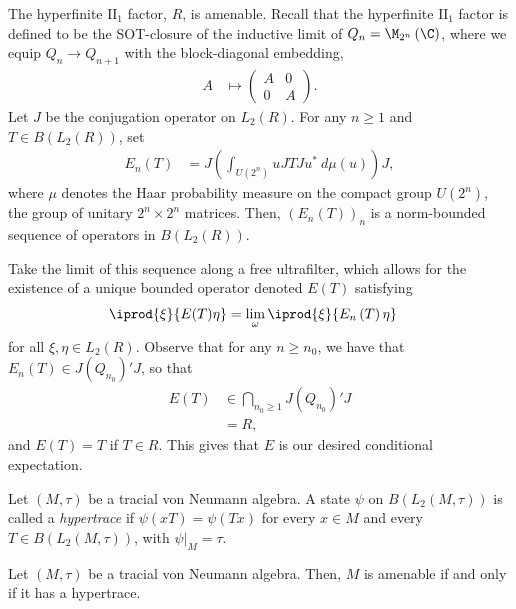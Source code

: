 \documentclass[10pt]{mypackage}
\begin{document}
\begin{example}
  The hyperfinite $\text{II}_1$ factor, $R$, is amenable. Recall that the hyperfinite $\text{II}_1$ factor is defined to be the SOT-closure of the inductive limit of $Q_n = \M_{2^n}\left( \C \right)$, where we equip $Q_n\rightarrow Q_{n+1}$ with the block-diagonal embedding,
  \begin{align*}
    A &\mapsto \begin{pmatrix}A  & 0 \\ 0 & A\end{pmatrix}.
  \end{align*}
  Let $J$ be the conjugation operator on $L_2\left( R \right)$. For any $n\geq 1$ and $T\in B\left( L_2\left( R \right) \right)$, set
  \begin{align*}
    E_n(T) &= J \left( \int_{U\left( 2^{n} \right)}^{} uJTJu^{\ast}\:d\mu(u) \right)J,
  \end{align*}
  where $\mu$ denotes the Haar probability measure on the compact group $U\left( 2^{n} \right)$, the group of unitary $2^{n}\times 2^{n}$ matrices. Then, $\left( E_n\left( T \right) \right)_n$ is a norm-bounded sequence of operators in $B\left( L_2\left( R \right) \right)$.

  Take the limit of this sequence along a free ultrafilter, which allows for the existence of a unique bounded operator denoted $E(T)$ satisfying
  \begin{align*}
    \iprod{\xi}{E(T)\eta} &= \lim_{\omega} \iprod{\xi}{E_n\left( T \right)\eta}
  \end{align*}
  for all $\xi,\eta\in L_2\left( R \right)$. Observe that for any $n\geq n_0$, we have that $E_n(T)\in J\left( Q_{n_0} \right)'J$, so that
  \begin{align*}
    E(T) &\in \bigcap_{n_0\geq 1} J\left( Q_{n_0} \right)'J\\
         &= R,
  \end{align*}
  and $E(T) = T$ if $T\in R$. This gives that $E$ is our desired conditional expectation.
\end{example}
\begin{definition}
  Let $\left( M,\tau \right)$ be a tracial von Neumann algebra. A state $\psi$ on $B\left( L_2\left( M,\tau \right) \right)$ is called a \textit{hypertrace} if $\psi\left( xT \right) = \psi\left( Tx \right)$ for every $x\in M$ and every $T\in B\left( L_2\left( M,\tau \right) \right)$, with $\psi|_{M} = \tau$.
\end{definition}
\begin{proposition}
  Let $\left( M,\tau \right)$ be a tracial von Neumann algebra. Then, $M$ is amenable if and only if it has a hypertrace.
\end{proposition}
\end{document}
